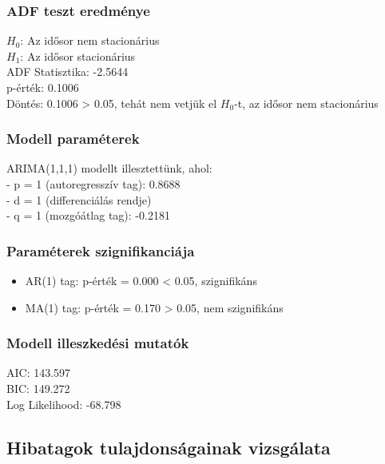 \documentclass[11pt]{article}
\providecommand{\tightlist}{%
      \setlength{\itemsep}{0pt}\setlength{\parskip}{0pt}}
\begin{document}
\subsubsection{ADF teszt eredménye}\label{adf-teszt-eredmuxe9nye}

$H_0$: Az idősor nem stacionárius\\
$H_1$: Az idősor stacionárius\\
ADF Statisztika: -2.5644\\
p-érték: 0.1006\\
Döntés: 0.1006 \textgreater{} 0.05, tehát nem vetjük el $H_0$-t, az idősor
nem stacionárius

\subsubsection{Modell paraméterek}\label{modell-paramuxe9terek}

ARIMA(1,1,1) modellt illesztettünk, ahol:\\
- p = 1 (autoregresszív tag): 0.8688\\
- d = 1 (differenciálás rendje)\\
- q = 1 (mozgóátlag tag): -0.2181

\subsubsection{Paraméterek
szignifikanciája}\label{paramuxe9terek-szignifikanciuxe1ja}

\begin{itemize}
\tightlist
\item
  AR(1) tag: p-érték = 0.000 \textless{} 0.05, szignifikáns\\
\item
  MA(1) tag: p-érték = 0.170 \textgreater{} 0.05, nem szignifikáns
\end{itemize}

\subsubsection{Modell illeszkedési
mutatók}\label{modell-illeszkeduxe9si-mutatuxf3k}

AIC: 143.597\\
BIC: 149.272\\
Log Likelihood: -68.798

\subsection{Hibatagok tulajdonságainak
vizsgálata}\label{hibatagok-tulajdonsuxe1gainak-vizsguxe1lata}
\end{document}
